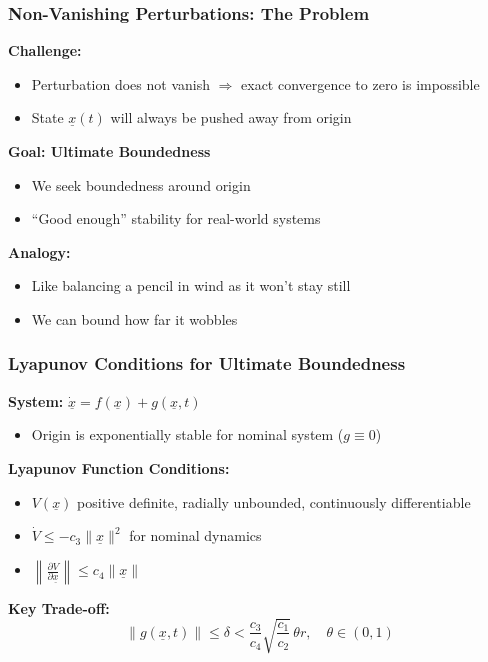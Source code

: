 \documentclass[student, noshadow, lsr, english, aspectratio=169, t]{ITR_LSR_slides}
\begin{document}
\begin{frame}
    \frametitle{Non-Vanishing Perturbations: The Problem}

    \textbf{Challenge:}
    \begin{itemize}
        \item Perturbation does not vanish $\Rightarrow$ exact convergence to zero is impossible
        \item State $\underline{x}(t)$ will always be pushed away from origin
    \end{itemize}

    \vspace{0.3cm}
    \textbf{Goal: Ultimate Boundedness}
    \begin{itemize}
        \item We seek boundedness around origin
        \item “Good enough” stability for real-world systems
    \end{itemize}

    \vspace{0.3cm}
    \textbf{Analogy:}
    \begin{itemize}
        \item Like balancing a pencil in wind as it won’t stay still
        \item We can bound how far it wobbles
    \end{itemize}
\end{frame}

\begin{frame}
    \frametitle{Lyapunov Conditions for Ultimate Boundedness}

    \textbf{System:} $\dot{\underline{x}} = f(\underline{x}) + g(\underline{x}, t)$
    \begin{itemize}
        \item Origin is exponentially stable for nominal system ($g \equiv 0$)
    \end{itemize}

    \vspace{0.3cm}
    \textbf{Lyapunov Function Conditions:}
    \begin{itemize}
        \item $V(\underline{x})$ positive definite, radially unbounded, continuously differentiable
        \item $\dot{V} \leq -c_3\|\underline{x}\|^2$ for nominal dynamics
        \item $\left\|\frac{\partial V}{\partial \underline{x}}\right\| \leq c_4\|\underline{x}\|$
    \end{itemize}

    \vspace{0.3cm}
    \textbf{Key Trade-off:}
    \[
        \|g(\underline{x}, t)\| \leq\delta < \frac{c_3}{c_4} \sqrt{\frac{c_1}{c_2}}\, \theta r, \quad \theta \in (0,1)
    \]
\end{frame}
\end{document}
